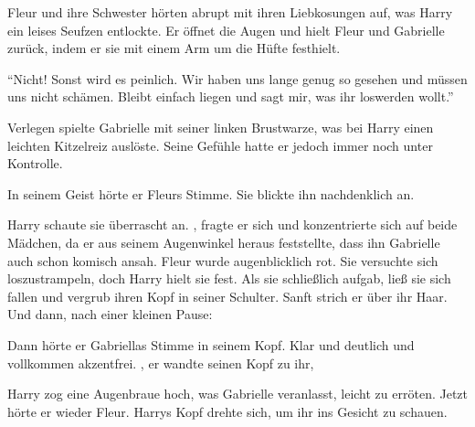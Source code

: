 Fleur und ihre Schwester hörten abrupt mit ihren Liebkosungen auf, was Harry ein leises Seufzen entlockte. Er öffnet die Augen und hielt Fleur und Gabrielle zurück, indem er sie mit einem Arm um die Hüfte festhielt.

\enquote{Nicht! Sonst wird es peinlich. Wir haben uns lange genug so gesehen und müssen uns nicht schämen. Bleibt einfach liegen und sagt mir, was ihr loswerden wollt.}

Verlegen spielte Gabrielle mit seiner linken Brustwarze, was bei Harry einen leichten Kitzelreiz auslöste. Seine Gefühle hatte er jedoch immer noch unter Kontrolle.

\begin{abAchtzehn}
In seinem Geist hörte er Fleurs Stimme.  Sie blickte ihn nachdenklich an. 

Harry schaute sie überrascht an. , fragte er sich und konzentrierte sich auf beide Mädchen, da er aus seinem Augenwinkel heraus feststellte, dass ihn Gabrielle auch schon komisch ansah. Fleur wurde augenblicklich rot. Sie versuchte sich loszustrampeln, doch Harry hielt sie fest. Als sie schließlich aufgab, ließ sie sich fallen und vergrub ihren Kopf in seiner Schulter. Sanft strich er über ihr Haar.  Und dann, nach einer kleinen Pause: 
\end{abAchtzehn}


Dann hörte er Gabriellas Stimme in seinem Kopf. Klar und deutlich und vollkommen akzentfrei. , er wandte seinen Kopf zu ihr, 

Harry zog eine Augenbraue hoch, was Gabrielle veranlasst, leicht zu erröten. Jetzt hörte er wieder Fleur. Harrys Kopf drehte sich, um ihr ins Gesicht zu schauen.

